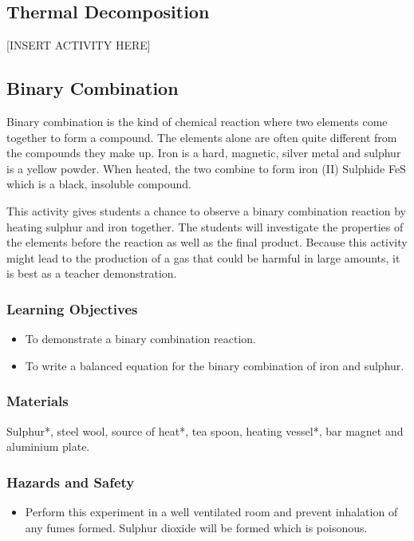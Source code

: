 \subsection{Thermal Decomposition}

[INSERT ACTIVITY HERE]

\subsection{Binary Combination}
Binary combination is the kind of chemical reaction where two elements come together to form a compound. The elements alone are often quite different from the compounds they make up. Iron is a hard, magnetic, silver metal and sulphur is a yellow powder. When heated, the two combine to form iron (II) Sulphide FeS which is a black, insoluble compound. 

This activity gives students a chance to observe a binary combination reaction by heating sulphur and iron together. The students will investigate the properties of the elements before the reaction as well as the final product. Because this activity might lead to the production of a gas that could be harmful in large amounts, it is best as a teacher demonstration.

\subsubsection*{Learning Objectives}
\begin{itemize}
\item{To demonstrate a binary combination reaction.}
\item{To write a balanced equation for the binary combination of iron and sulphur.}
\end{itemize}

\subsubsection*{Materials}
Sulphur*, steel wool, source of heat*, tea spoon, heating vessel*, bar magnet and aluminium plate.

\subsubsection*{Hazards and Safety}
\begin{itemize}
\item{Perform this experiment in a well ventilated room and prevent inhalation of any fumes formed. Sulphur dioxide will be formed which is poisonous.}
\end{itemize}

